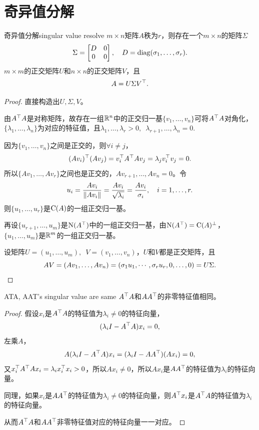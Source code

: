 \section{奇异值分解}
\begin{theorem}{奇异值分解}{singular value resolve}
	$m\times n$矩阵$A$秩为$r$，则存在一个$m\times n$的矩阵$\Sigma$ 
	\[
		\Sigma=\begin{bmatrix}
			D&0\\0&0
		\end{bmatrix},\quad D=\operatorname{diag}(\sigma_1,\ldots,\sigma_r).
	\]
	$m\times m$的正交矩阵$U$和$n\times n$的正交矩阵$V$，且 
	\[
		A=U\Sigma V^\top.
	\]
\end{theorem}
\begin{proof}
	直接构造出$U,\Sigma,V$。
	
	由$A^\top A$是对称矩阵，故存在一组$\mathbb R^n$中的正交归一基$\{v_1,\ldots,v_n\}$可将$A^\top A$对角化，$\{\lambda_1,\ldots,\lambda_n\}$为对应的特征值，且$\lambda_1,\ldots,\lambda_r>0,\enspace\lambda_{r+1},\ldots,\lambda_n=0.$
	
	因为$\{v_1,\ldots,v_n\}$之间是正交的，则$\forall i\neq j$，
	\[
		(Av_i)^\top(Av_j)=v_i^\top A^\top Av_j=\lambda_jv_i^\top v_j=0.
	\]
	所以$\{Av_1,\ldots,Av_r\}$之间也是正交的，$Av_{r+1},\ldots,Av_n=0$。令
	\[
		u_i=\frac{Av_i}{\left\lVert Av_i\right\rVert}=\frac{Av_i}{\sqrt{\lambda_i}}=\frac{Av_i}{\sigma_i},\quad i=1,\ldots,r.
	\]
	则$\{u_1,\ldots,u_r\}$是$\operatorname{C}(A)$的一组正交归一基。
	
	再设$\{u_{r+1},\ldots,u_m\}$是$\operatorname{N}(A^\top)$中的一组正交归一基，由$\operatorname{N}(A^\top)=\operatorname{C}(A)^\perp$，$\{u_1,\ldots,u_m\}$是$\mathbb R^m$的一组正交归一基。
	
	设矩阵$U=(u_1,\ldots,u_m),\enspace V=(v_1,\ldots,v_n)$，$U$和$V$都是正交矩阵，且
	\[
		AV=(Av_1,\ldots,Av_n)=(\sigma_1u_1,\cdots,\sigma_ru_r,0,\ldots,0)=U\Sigma.
		\qedhere
	\]
\end{proof}
\begin{theorem}{}{ATA, AAT's singular value are same}
	$A^\top A$和$AA^\top$的非零特征值相同。
\end{theorem}
\begin{proof}
	假设$x_i$是$A^\top A$的特征值为$\lambda_i\neq 0$的特征向量，
	\[
		(\lambda_iI-A^\top A)x_i=0,
	\]
	左乘$A$，
	\[
		A(\lambda_iI-A^\top A)x_i=(\lambda_iI-AA^\top)(Ax_i)=0,
	\]
	又$x_i^\top A^\top Ax_i=\lambda_i x_i^\top x_i>0$，所以$Ax_i\neq 0$，所以$Ax_i$是$AA^\top$的特征值为$\lambda_i$的特征向量。
	
	同理，如果$x_i$是$AA^\top$的特征值为$\lambda_i\neq 0$的特征向量，则$A^\top x_i$是$A^\top A$的特征值为$\lambda_i$的特征向量。
	
	从而$A^\top A$和$AA^\top$非零特征值对应的特征向量一一对应。
\end{proof}

